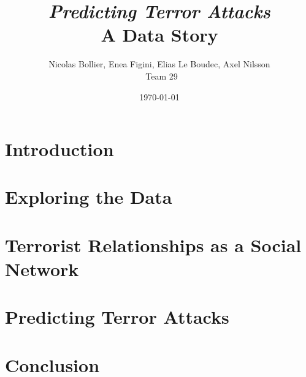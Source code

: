 \documentclass{beamer}
\title{\textit{Predicting Terror Attacks} \\A Data Story}
\author{Nicolas Bollier, Enea Figini, Elias Le Boudec, Axel Nilsson\\~Team 29}
\date{\today}
\begin{document}
\frame{\titlepage}

\section[Outline]{}
\frame{\tableofcontents}

\section{Introduction}


\section{Exploring the Data}


\section{Terrorist Relationships as a Social Network}


\section{Predicting Terror Attacks}


\section{Conclusion}

\end{document}
